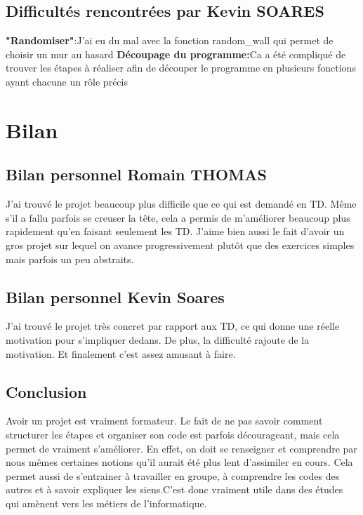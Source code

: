 \documentclass{article}
\begin{document}
\subsection{Difficultés rencontrées par Kevin SOARES}

\textbf{"Randomiser"}:J'ai eu du mal avec la fonction random\_wall qui permet de choisir un mur au hasard\newline
\textbf{Découpage du programme:}Ca a été compliqué de trouver les étapes à réaliser afin de découper le programme en plusieurs fonctions ayant chacune un rôle précis






\section{Bilan}
\subsection{Bilan personnel Romain THOMAS}
J'ai trouvé le projet beaucoup plus difficile que ce qui est demandé en TD. Même s'il a fallu parfois se creuser la tête, cela a permis de m'améliorer beaucoup plus rapidement qu'en faisant seulement les TD.\newline
J'aime bien aussi le fait d'avoir un gros projet sur lequel on avance progressivement plutôt que des exercices simples mais parfois un peu abstraits.
\subsection{Bilan personnel Kevin Soares}
J'ai trouvé le projet très concret par rapport aux TD, ce qui donne une réelle motivation pour s'impliquer dedans. De plus, la difficulté rajoute de la motivation. Et finalement c'est assez amusant à faire.

\subsection{Conclusion}
Avoir un projet est vraiment formateur. Le fait de ne pas savoir comment structurer les étapes et organiser son code est parfois décourageant, mais cela permet de vraiment s'améliorer. En effet, on doit se renseigner et comprendre par nous mêmes certaines notions qu'il aurait été plus lent d'assimiler en cours.\newline \newline
Cela permet aussi de s'entrainer à travailler en groupe, à comprendre les codes des autres et à savoir expliquer les siens.C'est donc vraiment utile dans des études qui amènent vers les métiers de l'informatique.
\end{document}
